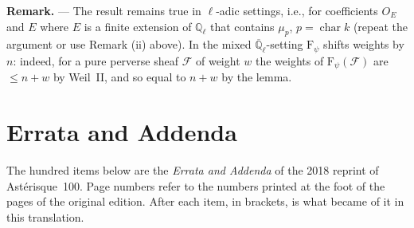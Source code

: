 \documentclass[12pt,oneside]{amsbook}
\theoremstyle{plain}
\theoremstyle{definition}
\newcommand{\FF}{\mathcal{F}}
\newcommand{\Ql}{\mathbb{Q}_{\ell}}
\newcommand{\Qlb}{\overline{\mathbb{Q}}_{\ell}}
\begin{document}
\medskip
\noindent\textbf{Remark.} --- The result remains true in $\ell$-adic settings, i.e., for coefficients $O_{E}$ and $E$ where $E$ is a finite extension of $\Ql$ that contains $\mu_{p}$, $p=\operatorname{char}k$ (repeat the argument or use Remark (ii) above). In the mixed $\Qlb$-setting $\mathrm{F}_{\psi}$ shifts weights by $n$: indeed, for a pure perverse sheaf $\FF$ of weight $w$ the weights of $\mathrm{F}_{\psi}(\FF)$ are $\leq n+w$ by Weil~II, and so equal to $n+w$ by the lemma.

\chapter*{Errata and Addenda}

The hundred items below are the \emph{Errata and Addenda} of the 2018 reprint of Astérisque~100. Page numbers refer to the numbers printed at the foot of the pages of the original edition. After each item, in brackets, is what became of it in this translation.
\end{document}
